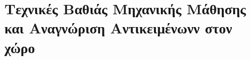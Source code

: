 \chapter{Τεχνικές Βαθιάς Μηχανικής Μάθησης και Αναγνώριση Αντικειμένωνν στον χώρο}
\label{chapter:theory}




